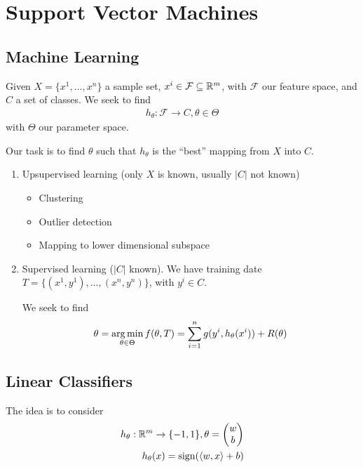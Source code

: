 

\chapter{Support Vector Machines}
\label{cha:supp-vect-mach}

\section{Machine Learning}
\label{sec:machine-learning}

Given $X = \{ x^{1}, \dots, x^{n} \}$ a sample set, $x^{i} \in
\mathcal{F} \subseteq \mathbb{R}^{m}$, with $\mathcal{F}$ our feature space,
and $C$ a set of classes.  We seek to find
\begin{align}
  \label{eq:89}
  h_{\theta}: \mathcal{F} \rightarrow C, \theta \in \Theta
\end{align} with $\Theta$ our parameter space.

Our task is to find $\theta$ such that $h_{\theta}$ is the ``best''
mapping from $X$ into $C$.

\begin{enumerate}
\item Upsupervised learning (only $X$ is known, usually $|C|$ not known)
  \begin{itemize}
  \item Clustering
  \item Outlier detection
  \item Mapping to lower dimensional subspace
  \end{itemize}
\item Supervised learning ($|C|$ known).  We have training date $T =
  \{ (x^{1}, y^{1}), \dots, (x^{n}, y^{n}) \}$, with $y^{i} \in C$.

  We seek to find
  \begin{align}
    \label{eq:90}
    \theta = \operatorname*{arg\,min}_{\theta \in \Theta} f(\theta, T) = \sum_{i=1}^{n}
    g(y^{i}, h_{\theta}(x^{i})) + R(\theta)
  \end{align}
\end{enumerate}

\section{Linear Classifiers}
\label{sec:linear-classifiers}

The idea is to consider
\begin{align}
  \label{eq:91}
  h_{\theta}: \R^{m} \rightarrow \{ -1, 1 \}, \theta =
  \begin{pmatrix}
    w \\
    b
  \end{pmatrix} \\
  h_{\theta}(x) = \sign (\IP{w, x} + b)
\end{align}

